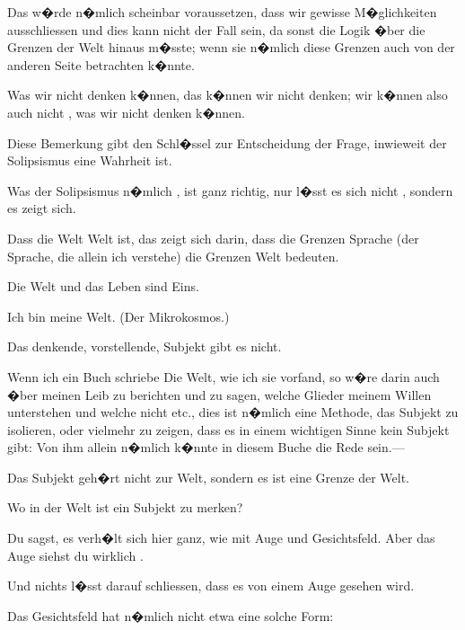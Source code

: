 \begin{propositions}
{Das w�rde n�mlich scheinbar voraussetzen, dass
\enlargethispage{9pt} %
wir gewisse M�glichkeiten ausschliessen und dies
kann nicht der Fall sein, da sonst die Logik
�ber die Grenzen der Welt hinaus m�sste; wenn
sie n�mlich diese Grenzen auch von der anderen
Seite betrachten k�nnte.

Was wir nicht denken k�nnen, das k�nnen wir
nicht denken; wir k�nnen also auch nicht ,
was wir nicht denken k�nnen.}


{Diese Bemerkung gibt den Schl�ssel zur
Entscheidung der Frage, inwieweit der Solipsismus
eine Wahrheit ist.

Was der Solipsismus n�mlich , ist ganz
richtig, nur l�sst es sich nicht , sondern es
zeigt sich.

Dass die Welt  Welt ist, das zeigt sich darin,
dass die Grenzen  Sprache (der Sprache, die allein
ich verstehe) die Grenzen  Welt bedeuten.}


{Die Welt und das Leben sind Eins.}


{Ich bin meine Welt. (Der Mikrokosmos.)}


{Das denkende, vorstellende, Subjekt gibt es nicht.

Wenn ich ein Buch schriebe \glqq{}Die Welt, wie ich
sie vorfand\grqq{}, so w�re darin auch �ber meinen Leib
zu berichten und zu sagen, welche Glieder meinem
Willen unterstehen und welche nicht etc., dies ist
n�mlich eine Methode, das Subjekt zu isolieren,
oder vielmehr zu zeigen, dass es in einem wichtigen
Sinne kein Subjekt gibt: Von ihm allein n�mlich
k�nnte in diesem Buche  die Rede sein.---}


{Das Subjekt geh�rt nicht zur Welt, sondern es
ist eine Grenze der Welt.}


{Wo in der Welt ist ein  Subjekt
zu merken?

Du sagst, es verh�lt sich hier ganz, wie mit Auge
und Gesichtsfeld. Aber das Auge siehst du wirklich
.

Und nichts  l�sst darauf
schliessen, dass es von einem Auge gesehen wird.}


{Das Gesichtsfeld hat n�mlich nicht etwa eine
solche Form:
}



\end{propositions}
